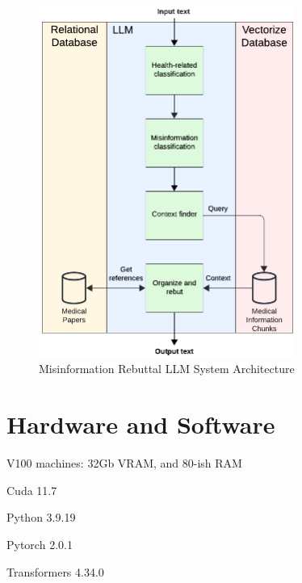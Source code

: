 \begin{figure}[H]
	\begin{center}
		\includegraphics[width=0.75\textwidth]{images/LLM_Pipeline} %
	\end{center}
	\caption{Misinformation Rebuttal LLM System Architecture} %
	\label{fig:llm}
\end{figure}

\section{Hardware and Software}
\list{-}
    \item V100 machines: 32Gb VRAM, and 80-ish RAM
    \item Cuda 11.7
    \item Python 3.9.19
    \item Pytorch 2.0.1
    \item Transformers 4.34.0

